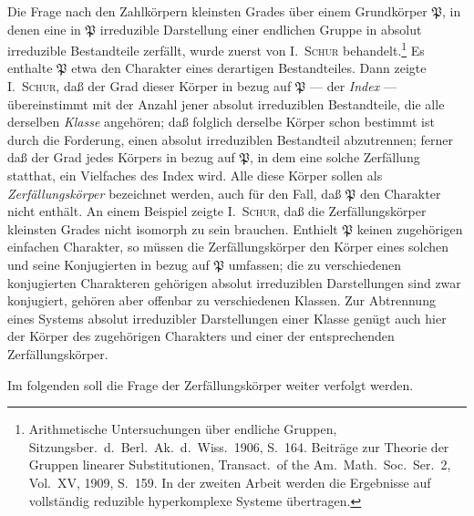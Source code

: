\documentclass[12pt,a4paper]{article}
\newcommand{\PP}{\mathfrak{P}}          %
\theoremstyle{definition}
\begin{document}
\vspace{0.5em}

Die Frage nach den Zahlk\"orpern kleinsten Grades \"uber einem
Grundk\"orper $\PP$, in denen eine in $\PP$ irreduzible Darstellung einer
endlichen Gruppe in absolut irreduzible Bestandteile zerf\"allt, wurde
zuerst von I.\ \textsc{Schur} behandelt.\footnote{Arithmetische
Untersuchungen \"uber endliche Gruppen, Sitzungsber.\ d.\ Berl.\ Ak.\ d.\ Wiss.\ 1906, S.\ 164.
Beitr\"age zur Theorie der Gruppen linearer Substitutionen, Transact.\ of the Am.\ Math.\ Soc.\ Ser.\ 2,
Vol.\ XV, 1909, S.\ 159. In der zweiten Arbeit werden die Ergebnisse auf vollst\"andig reduzible
hyperkomplexe Systeme \"ubertragen.} Es enthalte $\PP$ etwa den
Charakter eines derartigen Bestandteiles. Dann zeigte I.\ \textsc{Schur},
da\ss{} der Grad dieser K\"orper in bezug auf $\PP$ --- der \textit{Index} ---
\"ubereinstimmt mit der Anzahl jener absolut irreduziblen Bestandteile, die
alle derselben \textit{Klasse} angeh\"oren; da\ss{} folglich derselbe K\"orper schon
bestimmt ist durch die Forderung, einen absolut irreduziblen Bestandteil
abzutrennen; ferner da\ss{} der Grad jedes K\"orpers in bezug auf $\PP$, in
dem eine solche Zerf\"allung statthat, ein Vielfaches des Index wird.
Alle diese K\"orper sollen als \textit{Zerf\"allungsk\"orper} bezeichnet werden,
auch f\"ur den Fall, da\ss{} $\PP$ den Charakter nicht enth\"alt. An einem
Beispiel zeigte I.\ \textsc{Schur}, da\ss{} die Zerf\"allungsk\"orper kleinsten
Grades nicht isomorph zu sein brauchen. Enthielt $\PP$ keinen
zugeh\"origen einfachen Charakter, so m\"ussen die Zerf\"allungsk\"orper den
K\"orper eines solchen und seine Konjugierten in bezug auf $\PP$
umfassen; die zu verschiedenen konjugierten Charakteren geh\"origen absolut
irreduziblen Darstellungen sind zwar konjugiert, geh\"oren aber offenbar zu
verschiedenen Klassen. Zur Abtrennung eines Systems absolut irreduzibler
Darstellungen einer Klasse gen\"ugt auch hier der K\"orper des zugeh\"origen
Charakters und einer der entsprechenden Zerf\"allungsk\"orper.

Im folgenden soll die Frage der Zerf\"allungsk\"orper weiter verfolgt
werden.
\end{document}

